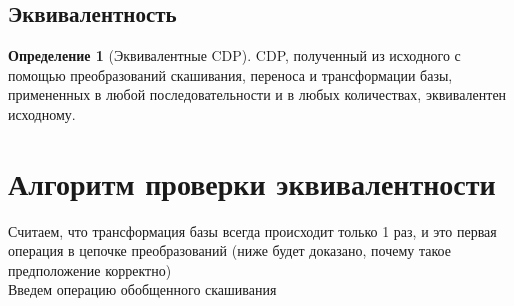 \documentclass[16pt]{article}
\theoremstyle{definition}
\newtheorem{definition}{Определение}[section]
\begin{document}
\subsection{Эквивалентность}
\begin{definition}[Эквивалентные CDP]
CDP, полученный из исходного с помощью преобразований скашивания, переноса и трансформации базы, примененных в любой последовательности и в любых количествах, эквивалентен исходному.
\end{definition}

\section{Алгоритм проверки эквивалентности}
Считаем, что трансформация базы всегда происходит только 1 раз, и это первая операция в цепочке преобразований (ниже будет доказано, почему такое предположение корректно)
\\
Введем операцию обобщенного скашивания
\end{document}

